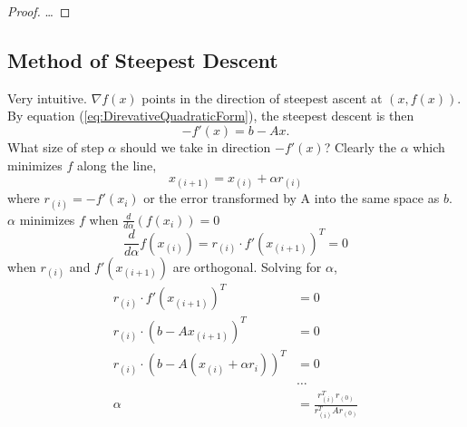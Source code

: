 \documentclass[../main.tex]{subfiles}
\begin{document}
\begin{proof}
\ldots
\end{proof}

\subsection{Method of Steepest Descent}
Very intuitive. $\nabla f(x)$ points in the direction of steepest ascent at $(x,f(x))$. By equation (\ref{eq:DirevativeQuadraticForm}), the steepest descent is then
\begin{equation}
-f'(x) = b - Ax.
\end{equation}
What size of step $\alpha$ should we take in direction $-f'(x)$? Clearly the $\alpha$ which minimizes $f$ along the line,
\begin{equation}
x_{(i+1)} = x_{(i)}+\alpha r_{(i)}
\end{equation}
where $r_{(i)} = -f'(x_i)$ or \color{red} the error transformed by A into the same space as $b$\color{black}. $\alpha$ minimizes $f$ when $\frac{d}{d\alpha}(f(x_{i})) = 0$
\begin{equation*}
\frac{d}{d\alpha}f(x_{(i)}) = r_{(i)} \cdot f'(x_{(i+1)})^T=0 
\end{equation*}
when $r_{(i)}$ and $f'(x_{(i+1)})$ are orthogonal. Solving for $\alpha$,
\begin{align}
r_{(i)} \cdot f'(x_{(i+1)})^T &= 0 \nonumber\\
r_{(i)} \cdot (b-Ax_{(i+1)})^T &= 0 \nonumber\\
r_{(i)} \cdot (b-A(x_{(i)}+\alpha r_{i}))^T &= 0 \nonumber\\
&\ldots\nonumber\\
\alpha &= \frac{r^T_{(i)}r_{(0)}}{r^T_{(i)}Ar_{(0)}}
\end{align}
\end{document}
